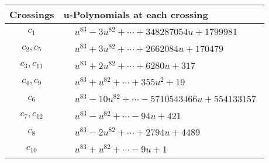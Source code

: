 \documentclass[1p]{elsarticle_modified}
\theoremstyle{definition}
\begin{document}
\begin{tabular}{m{50pt}|m{274pt}}
Crossings & \hspace{64pt}u-Polynomials at each crossing \\
\hline $$\begin{aligned}c_{1}\end{aligned}$$&$\begin{aligned}
&u^{83}-3 u^{82}+\cdots+348287054 u+1799981
\end{aligned}$\\
\hline $$\begin{aligned}c_{2},c_{5}\end{aligned}$$&$\begin{aligned}
&u^{83}+3 u^{82}+\cdots+2662084 u+170479
\end{aligned}$\\
\hline $$\begin{aligned}c_{3},c_{11}\end{aligned}$$&$\begin{aligned}
&u^{83}+2 u^{82}+\cdots+6280 u+317
\end{aligned}$\\
\hline $$\begin{aligned}c_{4},c_{9}\end{aligned}$$&$\begin{aligned}
&u^{83}+u^{82}+\cdots+355 u^2+19
\end{aligned}$\\
\hline $$\begin{aligned}c_{6}\end{aligned}$$&$\begin{aligned}
&u^{83}-10 u^{82}+\cdots-5710543466 u+554133157
\end{aligned}$\\
\hline $$\begin{aligned}c_{7},c_{12}\end{aligned}$$&$\begin{aligned}
&u^{83}- u^{82}+\cdots-94 u+421
\end{aligned}$\\
\hline $$\begin{aligned}c_{8}\end{aligned}$$&$\begin{aligned}
&u^{83}-2 u^{82}+\cdots+2794 u+4489
\end{aligned}$\\
\hline $$\begin{aligned}c_{10}\end{aligned}$$&$\begin{aligned}
&u^{83}+u^{82}+\cdots-9 u+1
\end{aligned}$\\
\hline
\end{tabular}\\~\\
\end{document}
